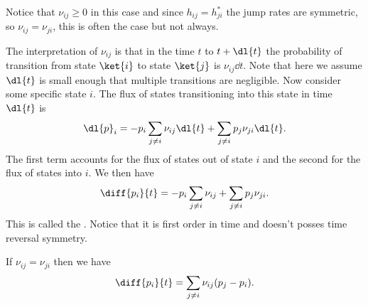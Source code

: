 \documentclass[fleqn]{NotesClass}
\begin{document}
    Notice that \(\nu_{ij} \ge 0\) in this case and since \(h_{ij} = h_{ji}^*\) the jump rates are symmetric, so \(\nu_{ij} = \nu_{ji}\), this is often the case but not always.
    
    The interpretation of \(\nu_{ij}\) is that in the time \(t\) to \(t + \dl{t}\) the probability of transition from state \(\ket{i}\) to state \(\ket{j}\) is \(\nu_{ij}\dd{t}\).
    Note that here we assume \(\dl{t}\) is small enough that multiple transitions are negligible.
    Now consider some specific state \(i\).
    The flux of states transitioning into this state in time \(\dl{t}\) is
    \begin{equation}
        \dl{p}_i = -p_i\sum_{j\ne i} \nu_{ij}\dl{t} + \sum_{j\ne i} p_j\nu_{ji}\dl{t}.
    \end{equation}
    The first term accounts for the flux of states out of state \(i\) and the second for the flux of states into \(i\).
    We then have
    \begin{equation}
        \diff{p_i}{t} = -p_i\sum_{j \ne i} \nu_{ij} + \sum_{j\ne i} p_j\nu_{ji}.
    \end{equation}
    This is called the .
    Notice that it is first order in time and doesn't posses time reversal symmetry.
    
    If \(\nu_{ij} = \nu_{ji}\) then we have
    \begin{equation}
        \diff{p_i}{t} = \sum_{j\ne i} \nu_{ij}(p_j - p_i).
    \end{equation}
    
    
%        
    
    \backmatter
    \renewcommand{\glossaryname}{Acronyms}
    \printglossary[acronym]
    \printindex
\end{document}
